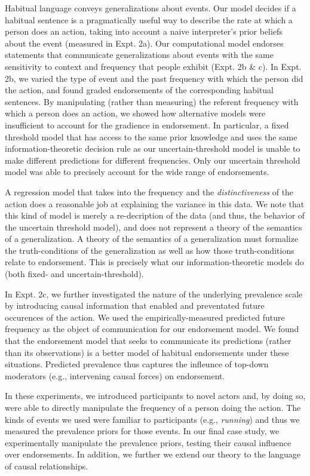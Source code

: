 \documentclass[english,floatsintext,man]{apa6}
\theoremstyle{definition}
\theoremstyle{definition}
\theoremstyle{definition}
\theoremstyle{remark}
\begin{document}
Habitual language conveys generalizations about events. Our model
decides if a habitual sentence is a pragmatically useful way to describe
the rate at which a person does an action, taking into account a naive
interpreter's prior beliefs about the event (measured in Expt. 2a). Our
computational model endorses statements that communicate generalizations
about events with the same sensitivity to context and frequency that
people exhibit (Expt. 2b \& c). In Expt. 2b, we varied the type of event
and the past frequency with which the person did the action, and found
graded endorsements of the corresponding habitual sentences. By
manipulating (rather than measuring) the referent frequency with which a
person does an action, we showed how alternative models were
insufficient to account for the gradience in endorsement. In particular,
a fixed threshold model that has access to the same prior knowledge and
uses the same information-theoretic decision rule as our
uncertain-threshold model is unable to make different predictions for
different frequencies. Only our uncertain threshold model was able to
precisely account for the wide range of endorsements.

A regression model that takes into the frequency and the
\emph{distinctiveness} of the action does a reasonable job at explaining
the variance in this data. We note that this kind of model is merely a
re-decription of the data (and thus, the behavior of the uncertain
threshold model), and does not represent a theory of the semantics of a
generalization. A theory of the semantics of a generalization must
formalize the truth-conditions of the generalization as well as how
those truth-conditions relate to endorsement. This is precisely what our
information-theoretic models do (both fixed- and uncertain-threshold).

In Expt. 2c, we further investigated the nature of the underlying
prevalence scale by introducing causal information that enabled and
preventated future occurences of the action. We used the
empirically-measured predicted future frequency as the object of
communication for our endorsement model. We found that the endorsement
model that seeks to communicate its predictions (rather than its
observations) is a better model of habitual endorsements under these
situations. Predicted prevalence thus captures the infleunce of top-down
moderators (e.g., intervening causal forces) on endorsement.

In these experiments, we introduced participants to novel actors and, by
doing so, were able to directly manipulate the frequency of a person
doing the action. The kinds of events we used were familiar to
participants (e.g., \emph{running}) and thus we measured the prevalence
priors for those events. In our final case study, we experimentally
manipulate the prevalence priors, testing their causal influence over
endorsements. In addition, we further we extend our theory to the
language of causal relationships.
\end{document}
